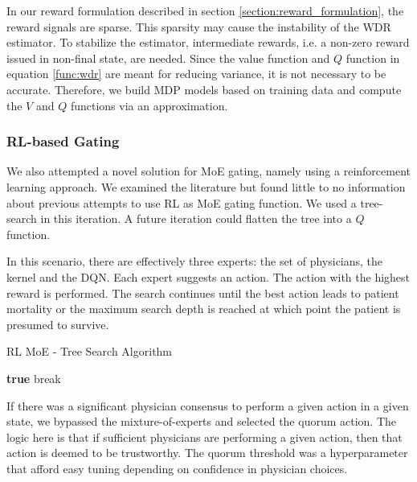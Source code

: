 \documentclass[letterpaper]{article}
\begin{document}
In our reward formulation described in section \ref{section:reward_formulation}, the reward signals are sparse. This sparsity may cause the instability of the WDR estimator. To stabilize the estimator, intermediate rewards, i.e. a non-zero reward issued in non-final state, are needed. Since the value function and $Q$ function in equation \ref{func:wdr} are meant for reducing variance, it is not necessary to be accurate. Therefore, we build MDP models based on training data and compute the $V$ and $Q$ functions via an approximation.  

\subsubsection{RL-based Gating}

We also attempted a novel solution for MoE gating, namely using a reinforcement learning approach. We examined the literature but found little to no
information about previous attempts to use RL as MoE gating function. We used a tree-search
in this iteration. A future iteration could flatten the tree into a $Q$ function.

In this scenario, there are effectively three experts: the set of physicians, the kernel and the DQN. Each
expert suggests an action. The action with the highest reward is performed. The search continues
until the best action leads to patient mortality or the maximum search depth is reached at which 
point the patient is presumed to survive.

\begin{algorithm}
\caption{RL MoE - Tree Search Algorithm}\label{euclid}
\begin{algorithmic}[1]
    \Else
        \EndFor
    \EndIf
    	 \textbf{true}
        \State break
    \EndIf
\EndWhile
\EndProcedure
\end{algorithmic}
\end{algorithm}

If there was a significant physician consensus to perform a given action in a given state, 
we bypassed the mixture-of-experts and selected the quorum action. The logic here is that 
if sufficient physicians are performing a given action, then that action is deemed to be trustworthy. 
The quorum threshold was a hyperparameter that afford easy tuning depending on confidence
in physician choices. 
\end{document}
